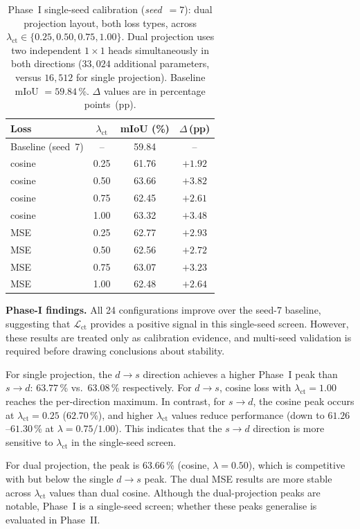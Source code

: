 \begin{table}[H]
\centering
\caption{Phase~I single-seed calibration (\textit{seed}~$=7$): dual
projection layout, both loss types, across
$\lambda_\text{ct} \in \{0.25, 0.50, 0.75, 1.00\}$. Dual projection
uses two independent $1{\times}1$ heads simultaneously in both
directions ($33{,}024$ additional parameters, versus $16{,}512$ for
single projection). Baseline mIoU $= 59.84$\,\%. $\Delta$ values are in
percentage points~(pp).}
\label{tab:ct-p1-dual}
\renewcommand{\arraystretch}{1.2}
\begin{tabular}{lccc}
\toprule
Loss & $\lambda_\text{ct}$ & mIoU (\%) & $\Delta$\,(pp) \\
\midrule
Baseline (seed~7) & -- & 59.84 & -- \\
\midrule
cosine & 0.25 & 61.76 & $+1.92$ \\
cosine & 0.50 & 63.66 & $+3.82$ \\
cosine & 0.75 & 62.45 & $+2.61$ \\
cosine & 1.00 & 63.32 & $+3.48$ \\
\midrule
MSE & 0.25 & 62.77 & $+2.93$ \\
MSE & 0.50 & 62.56 & $+2.72$ \\
MSE & 0.75 & 63.07 & $+3.23$ \\
MSE & 1.00 & 62.48 & $+2.64$ \\
\bottomrule
\end{tabular}
\end{table}

\noindent
\textbf{Phase-I findings.}
All 24 configurations improve over the seed-7 baseline, suggesting that
$\mathcal{L}_\text{ct}$ provides a positive signal in this single-seed
screen. However, these results are treated only as calibration evidence,
and multi-seed validation is required before drawing conclusions about
stability.

For single projection, the $d{\rightarrow}s$ direction achieves a higher
Phase~I peak than $s{\rightarrow}d$: $63.77$\,\% vs.\ $63.08$\,\%
respectively. For $d{\rightarrow}s$, cosine loss with
$\lambda_\text{ct}=1.00$ reaches the per-direction maximum. In contrast,
for $s{\rightarrow}d$, the cosine peak occurs at $\lambda_\text{ct}=0.25$
($62.70$\,\%), and higher $\lambda_\text{ct}$ values reduce performance
(down to $61.26$--$61.30$\,\% at $\lambda=0.75/1.00$). This indicates
that the $s{\rightarrow}d$ direction is more sensitive to
$\lambda_\text{ct}$ in the single-seed screen.

For dual projection, the peak is $63.66$\,\% (cosine, $\lambda=0.50$),
which is competitive with but below the single $d{\rightarrow}s$ peak.
The dual MSE results are more stable across $\lambda_\text{ct}$ values
than dual cosine. Although the dual-projection peaks are notable,
Phase~I is a single-seed screen; whether these peaks generalise is
evaluated in Phase~II.

